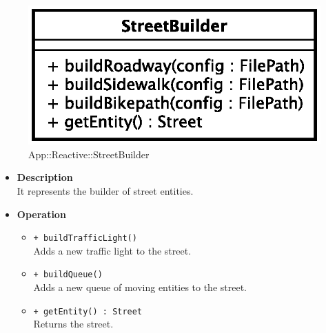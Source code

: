\begin{figure}[h]
\centering
\includegraphics[scale=0.6,keepaspectratio]{images/solution/street_builder.eps}
\caption{App::Reactive::StreetBuilder}
\label{fig:sd-app-street_builder}
\end{figure}
\FloatBarrier
\begin{itemize}
  \item \textbf{Description} \\
    It represents the builder of street entities. 
  \item \textbf{Operation}
  \begin{itemize} 
    \item \texttt{+ buildTrafficLight()} \\
Adds a new traffic light to the street.
    \item \texttt{+ buildQueue()} \\
Adds a new queue of moving entities to the street.
    \item \texttt{+ getEntity() : Street} \\
Returns the street.
  \end{itemize}
\end{itemize}
